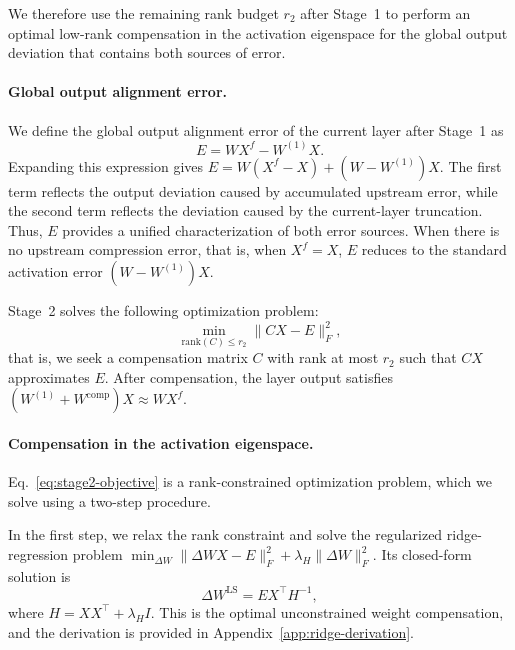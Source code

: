 \documentclass[a4paper,fleqn]{cas-dc}
\begin{document}
We therefore use the remaining rank budget $r_2$ after Stage~1 to perform an optimal low-rank compensation in the activation eigenspace for the global output deviation that contains both sources of error.

\paragraph{Global output alignment error.}
We define the global output alignment error of the current layer after Stage~1 as
\begin{equation}
E = WX^f - W^{(1)}X.
\label{eq:global-alignment-error}
\end{equation}
Expanding this expression gives $E = W(X^f - X) + (W - W^{(1)})X$. The first term reflects the output deviation caused by accumulated upstream error, while the second term reflects the deviation caused by the current-layer truncation. Thus, $E$ provides a unified characterization of both error sources. When there is no upstream compression error, that is, when $X^f = X$, $E$ reduces to the standard activation error $(W-W^{(1)})X$.

Stage~2 solves the following optimization problem:
\begin{equation}
\min_{\mathrm{rank}(C) \le r_2} \|CX - E\|_F^2,
\label{eq:stage2-objective}
\end{equation}
that is, we seek a compensation matrix $C$ with rank at most $r_2$ such that $CX$ approximates $E$. After compensation, the layer output satisfies $(W^{(1)} + W^{\mathrm{comp}})X \approx WX^f$.

\paragraph{Compensation in the activation eigenspace.}
Eq.~\eqref{eq:stage2-objective} is a rank-constrained optimization problem, which we solve using a two-step procedure.

In the first step, we relax the rank constraint and solve the regularized ridge-regression problem
$\min_{\Delta W} \|\Delta W X - E\|_F^2 + \lambda_H \|\Delta W\|_F^2$.
Its closed-form solution is
\begin{equation}
\Delta W^{\mathrm{LS}} = EX^\top H^{-1},
\label{eq:ridge-solution}
\end{equation}
where $H = XX^\top + \lambda_H I$. This is the optimal unconstrained weight compensation, and the derivation is provided in Appendix~\ref{app:ridge-derivation}.
\end{document}
